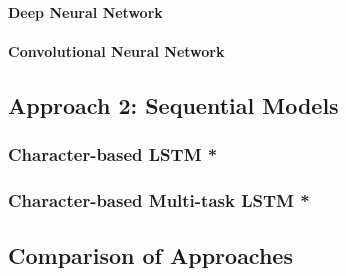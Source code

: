 \paragraph{Deep Neural Network}
\paragraph{Convolutional Neural Network}

\subsection{Approach 2: Sequential Models}
\label{sub:Approach 2: Sequential Models (Results)}


\subsubsection{Character-based LSTM *}

\subsubsection{Character-based Multi-task LSTM *}

\subsection{Comparison of Approaches}
